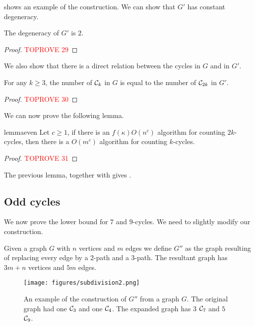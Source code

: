 \documentclass[a4paper,UKenglish,cleveref, autoref, numberwithinsect, thm-restate]{lipics-v2021}
\newcommand{\cycle}[1]{\cC_{#1}}
\newcommand{\expandG}{G'}
\newcommand{\expandGOdd}{G''}
\newcommand{\degen}{\kappa}
\newcommand{\cC}{{\cal C}}
\begin{document}
		 shows an example of the construction. We can show that $\expandG$ has constant degeneracy.
		
		\begin{claim} \label{lem:degen}
			The degeneracy of $\expandG$ is $2$.
		\end{claim}
		\begin{proof}\textcolor{red}{TOPROVE 29}\end{proof}
	
		We also show that there is a direct relation between the cycles in $G$ and in $\expandG$.
	
		\begin{lemma} \label{lem:equivalence}
			For any $k\geq 3$, the number of $\cycle{k}$ in $G$ is equal to the number of $\cycle{2k}$ in $\expandG$.
		\end{lemma}
		\begin{proof}\textcolor{red}{TOPROVE 30}\end{proof}
	
		We can now prove the following lemma.
		
		\begin{restatable}{lemma}{even} \label{thm:even}
			Let $c\geq 1$, if there is an $f(\degen)O(n^c)$ algorithm for counting $2k$-cycles, then there is a $O(m^c)$ algorithm for counting $k$-cycles. 
		\end{restatable}
		\begin{proof}\textcolor{red}{TOPROVE 31}\end{proof}
		
		The previous lemma, together with  gives .

		\fivecycle*
		
		\subsection{Odd cycles}
		
		We now prove the lower bound for $7$ and $9$-cycles. We need to slightly modify our construction.
		
		\begin{definition} 
			Given a graph $G$ with $n$ vertices and $m$ edges we define $\expandGOdd$ as the graph resulting of replacing every edge by a $2$-path and a $3$-path. The resultant graph has $3m+n$ vertices and $5m$ edges.
		\end{definition}
		
		\begin{figure}
			\centering
			\texttt{[image: figures/subdivision2.png]}\caption{An example of the construction of $\expandGOdd$ from a graph $G$. The original graph had one $\cycle{3}$ and one $\cycle{4}$. The expanded graph has $3$ $\cycle{7}$ and $5$ $\cycle{9}$.}
			\label{fig:subdivision2}
		\end{figure}
		
\end{document}
